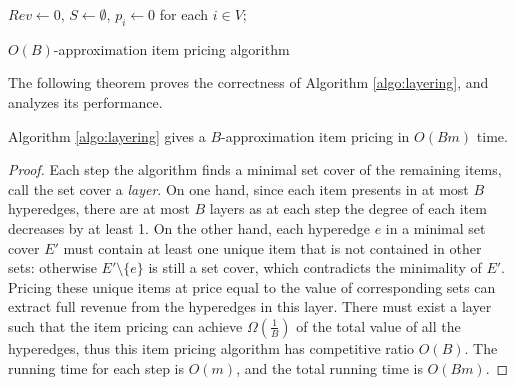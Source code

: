\begin{algorithm}[!htp]
	\DontPrintSemicolon 
	\BlankLine
	$Rev \leftarrow 0$, $S\leftarrow \emptyset$, $p_i\leftarrow 0$ for each $i\in V$;\\
	\caption{$O(B)$-approximation item pricing algorithm}
	\label{algo:layering}
\end{algorithm}

The following theorem proves the correctness of Algorithm \ref{algo:layering}, and analyzes its performance.

\begin{theorem}
\label{thm-Bapprox}

Algorithm \ref{algo:layering} gives a $B$-approximation item pricing in $O(Bm)$ time. 

\end{theorem}

\begin{proof}
Each step the algorithm finds a minimal set cover of the remaining items, call the set cover a \textit{layer}.
On one hand, since each item presents in at most $B$ hyperedges, there are at most $B$ layers as at each step the degree of each item decreases by at least 1. On the other hand, each hyperedge $e$ in a minimal
set cover $E'$ must contain at least one unique item that is not contained in other sets: otherwise $E'\setminus \{e\}$ is still a set cover,
which contradicts the minimality of $E'$. Pricing these unique items at price equal to the value of corresponding sets can extract full revenue from the hyperedges in this layer. There must exist a layer such that the item pricing can achieve 
$\Omega(\frac{1}{B})$ of the total value of all the hyperedges, thus this item pricing algorithm has competitive ratio $O(B)$. The running time for each step is $O(m)$, and the total running time is $O(Bm)$.

\end{proof}
